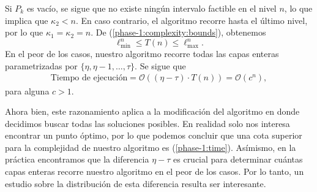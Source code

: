 Si $P_k$ es vacío, se sigue que no existe ningún intervalo factible en el nivel $n$, lo que implica
que $\kappa_2 < n$. En caso contrario, el algoritmo recorre hasta el último nivel, por lo que $\kappa_1
= \kappa_2 = n$. De (\ref{phase-1:complexity:bounds}), obtenemos
\begin{equation}
	\ell_{\min}^{n} \leq T(n) \leq \ell_{\max}^{n}.
\end{equation}
En el peor de los casos, nuestro algoritmo recorre todas las capas enteras parametrizadas por
$\lbrace \eta, \eta - 1, \ldots, \tau\rbrace$. Se sigue que
\begin{align}
	\label{phase-1:time}
	\text{Tiempo de ejecución}
	= \mathcal{O}((\eta - \tau) \cdot T(n))
	= \mathcal{O}(c^{n}),
\end{align}
para alguna $c > 1$.

Ahora bien, este razonamiento aplica a la modificación del algoritmo en donde decidimos buscar todas
las soluciones posibles. En realidad solo nos interesa encontrar un punto óptimo, por lo que podemos
concluir que una cota superior para la complejidad de nuestro algoritmo es (\ref{phase-1:time}).
Asímismo, en la práctica encontramos que la diferencia $\eta - \tau$ es crucial para determinar
cuántas capas enteras recorre nuestro algoritmo en el peor de los casos. Por lo tanto, un estudio
sobre la distribución de esta diferencia resulta ser interesante.
